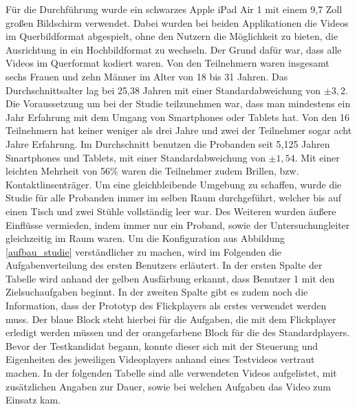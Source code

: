 \documentclass[11pt,a4paper]{report}
\begin{document}
Für die Durchführung wurde ein schwarzes Apple iPad Air 1 mit einem 9,7 Zoll großen Bildschirm verwendet. Dabei wurden bei beiden Applikationen die Videos im Querbildformat abgespielt, ohne den Nutzern die Möglichkeit zu bieten, die Ausrichtung in ein Hochbildformat zu wechseln. Der Grund dafür war, dass alle Videos im Querformat kodiert waren. Von den Teilnehmern waren insgesamt sechs Frauen und zehn Männer im Alter von 18 bis 31 Jahren. Das Durchschnittsalter lag bei 25,38 Jahren mit einer Standardabweichung von $\pm 3,2$. Die Voraussetzung um bei der Studie teilzunehmen war, dass man mindestens ein Jahr Erfahrung mit dem Umgang von Smartphones oder Tablets hat. Von den 16 Teilnehmern hat keiner weniger als drei Jahre und zwei der Teilnehmer sogar acht Jahre Erfahrung. Im Durchschnitt benutzen die Probanden seit 5,125 Jahren Smartphones und Tablets, mit einer Standardabweichung von $\pm 1,54$. Mit einer leichten Mehrheit von 56\% waren die Teilnehmer zudem Brillen, bzw. Kontaktlinsenträger. Um eine gleichbleibende Umgebung zu schaffen, wurde die Studie für alle Probanden immer im selben Raum durchgeführt, welcher bis auf einen Tisch und zwei Stühle vollständig leer war. Des Weiteren wurden äußere Einflüsse vermieden, indem immer nur ein Proband, sowie der Untersuchungleiter gleichzeitig im Raum waren. Um die Konfiguration aus Abbildung \ref{aufbau_studie} verständlicher zu machen, wird im Folgenden die Aufgabenverteilung des ersten Benutzers erläutert. In der ersten Spalte der Tabelle wird anhand der gelben Ausfärbung erkannt, dass Benutzer 1 mit den Zielsuchaufgaben beginnt. In der zweiten Spalte gibt es zudem noch die Information, dass der Prototyp des Flickplayers als erstes verwendet werden muss. Der blaue Block steht hierbei für die Aufgaben, die mit dem Flickplayer erledigt werden müssen und der orangefarbene Block für die des Standardplayers. Bevor der Testkandidat begann, konnte dieser sich mit der Steuerung und Eigenheiten des jeweiligen Videoplayers anhand eines Testvideos vertraut machen. In der folgenden Tabelle sind alle verwendeten Videos aufgelistet, mit zusätzlichen Angaben zur Dauer, sowie bei welchen Aufgaben das Video zum Einsatz kam.
\end{document}
